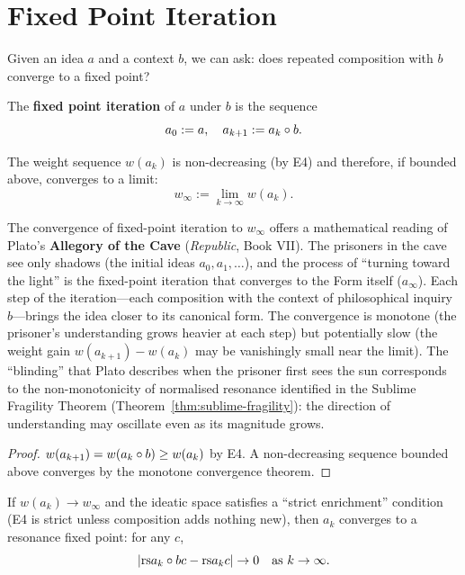 \section{Fixed Point Iteration}

Given an idea $a$ and a context $b$, we can ask: does repeated composition
with $b$ converge to a fixed point?

\begin{definition}
\label{def:fp-iteration}
The \textbf{fixed point iteration} of $a$ under $b$ is the sequence
\[
  a_0 := a, \quad a_{k+1} := a_k \circ b.
\]
\end{definition}

\begin{theorem}
\label{thm:fp-weight-convergence}
The weight sequence $w(a_k)$ is non-decreasing (by E4) and therefore, if
bounded above, converges to a limit:
\[
  w_{\infty} := \lim_{k \to \infty} w(a_k).
\]
\end{theorem}

\begin{remark}
\label{rem:ch10:convergence_plato_cave}
The convergence of fixed-point iteration to $w_\infty$ offers a mathematical
reading of Plato's \textbf{Allegory of the Cave} (\emph{Republic}, Book VII).
The prisoners in the cave see only shadows (the initial ideas $a_0, a_1,
\ldots$), and the process of ``turning toward the light'' is the fixed-point
iteration that converges to the Form itself ($a_\infty$).  Each step of the
iteration---each composition with the context of philosophical inquiry
$b$---brings the idea closer to its canonical form.  The convergence is
monotone (the prisoner's understanding grows heavier at each step) but
potentially slow (the weight gain $w(a_{k+1}) - w(a_k)$ may be vanishingly
small near the limit).  The ``blinding'' that Plato describes when the
prisoner first sees the sun corresponds to the non-monotonicity of
normalised resonance identified in the Sublime Fragility Theorem
(Theorem~\ref{thm:sublime-fragility}): the direction of understanding may
oscillate even as its magnitude grows.
\end{remark}



\begin{proof}
$w(a_{k+1}) = w(a_k \circ b) \geq w(a_k)$ by E4.  A non-decreasing
sequence bounded above converges by the monotone convergence theorem.
\end{proof}

\begin{proposition}
\label{prop:approx-fp}
If $w(a_k) \to w_{\infty}$ and the ideatic space satisfies a ``strict
enrichment'' condition (E4 is strict unless composition adds nothing new),
then $a_k$ converges to a resonance fixed point: for any $c$,
\[
  |\mathrm{rs}{a_k \circ b}{c} - \mathrm{rs}{a_k}{c}| \to 0
  \quad \text{as } k \to \infty.
\]
\end{proposition}

